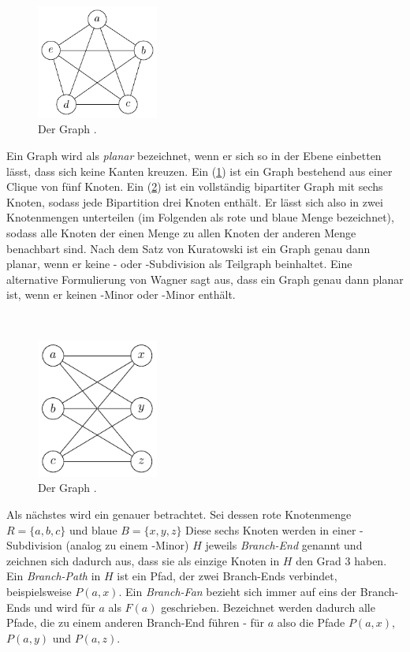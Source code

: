 \begin{figure}
  \includegraphics[width=4cm]{bilder/K_5.pdf}
  \caption{Der Graph \kf.}
  \label{fig:K5}
\end{figure}
Ein Graph wird als \emph{planar} bezeichnet, wenn er sich so in der Ebene einbetten lässt, dass sich keine Kanten kreuzen.
Ein \kf (\sAbb \ref{fig:K5}) ist ein Graph bestehend aus einer Clique von fünf Knoten.
Ein \kdd (\sAbb \ref{fig:K33}) ist ein vollständig bipartiter Graph mit sechs Knoten, sodass jede Bipartition drei Knoten enthält.
Er lässt sich also in zwei Knotenmengen unterteilen (im Folgenden als rote und blaue Menge bezeichnet), sodass alle Knoten der einen Menge zu allen Knoten der anderen Menge benachbart sind.
Nach dem Satz von Kuratowski ist ein Graph genau dann planar, wenn er keine \kf- oder \kdd-Subdivision als Teilgraph beinhaltet.
Eine alternative Formulierung von Wagner sagt aus, dass ein Graph genau dann planar ist, wenn er keinen \kf-Minor oder \kdd-Minor enthält.\cite{Die12}

\ \\
\begin{figure}
  \includegraphics[width=4cm]{bilder/K_33.pdf}
  \caption{Der Graph \kdd.}
  \label{fig:K33}
\end{figure}
Als nächstes wird ein \kdd genauer betrachtet.
Sei dessen rote Knotenmenge $R = \{a, b, c\}$ und blaue $B = \{x, y, z\}$
Diese sechs Knoten werden in einer \kdd-Subdivision (analog zu einem \kdd-Minor) $H$ jeweils \emph{Branch-End} genannt und zeichnen sich dadurch aus, dass sie als einzige Knoten in $H$ den Grad 3 haben.
Ein \emph{Branch-Path} in $H$ ist ein Pfad, der zwei Branch-Ends verbindet, beispielsweise $P(a, x)$.
Ein \emph{Branch-Fan} bezieht sich immer auf eins der Branch-Ends und wird \zB für $a$ als $F(a)$ geschrieben.
Bezeichnet werden dadurch alle Pfade, die zu einem anderen Branch-End führen - für $a$ also die Pfade $P(a, x)$, $P(a, y)$ und $P(a, z)$.


